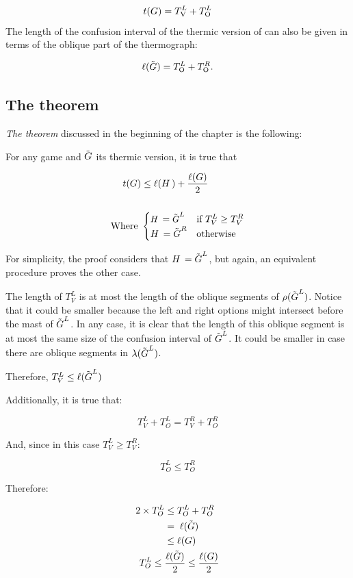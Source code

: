 $$
	t(\mbox{$G$}) = T^L_{\text{V}} + T^L_{\text{O}}
$$
\newpage
The length of the confusion interval of the thermic version of \Gm{} can also be given in terms of the oblique part of the thermograph:

$$
\ell(\tilde{\mbox{$G$}}) = T^L_{\text{O}} + T^R_{\text{O}}.
$$

\subsection*{The theorem}

\textit{The theorem} discussed in the beginning of the chapter is the following:

For any game \Gm{} and $\tilde{\mbox{$G$}}$ its thermic version, it is true that


\begin{align*}
	t(\mbox{$G$}) &\leq \ell(\mbox{$H\,$}) + \frac{\ell(\mbox{$G$})}{2} \\
	& \\
	\text{Where } &\begin{cases}
		\small
		\mbox{$H\,$} = \tilde{\mbox{$G$}}^L &\text{if } T^L_V \ge T^R_V \\
		\mbox{$H\,$} = \tilde{\mbox{$G$}}^R &\text{otherwise} \\
	\end{cases}
\end{align*}

For simplicity, the proof considers that $\mbox{$H\,$} = \tilde{\mbox{$G$}}^L$, but again, an equivalent procedure proves the other case.

The length of $T^L_V$ is at most the length of the oblique segments of $\rho(\tilde{\mbox{$G$}}^L)$. Notice that it could be smaller because the left and right options might intersect before the mast of $\tilde{\mbox{$G$}}^L$. In any case, it is clear that the length of this oblique segment is at most the same size of the confusion interval of $\tilde{\mbox{$G$}}^L$. It could be smaller in case there are oblique segments in $\lambda(\tilde{\mbox{$G$}}^L)$.

Therefore, $T^L_V \leq \ell(\tilde{\mbox{$G$}}^L)$

Additionally, it is true that:

$$
T^L_V + T^L_O = T^R_V+T^R_O
$$

And, since in this case $T^L_V \ge T^R_V$:

$$
T^L_O \leq T^R_O
$$

Therefore:

\begin{align*}
	2\times T^L_O &\leq T^L_O + T^R_O \\
	&= \;\ell(\tilde{\mbox{$G$}})\\
	&\leq \ell(\mbox{$G$})\\
	T^L_O \leq\; &\frac{\ell(\tilde{\mbox{$G$}})}{2} \leq \frac{\ell(\mbox{$G$})}{2}
\end{align*}

